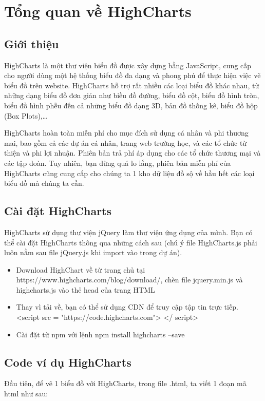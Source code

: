 \section{Tổng quan về HighCharts \cite{highcharts}} 

\subsection{Giới thiệu}
HighCharts là một thư viện biểu đồ được xây dựng bằng JavaScript, cung cấp cho người dùng một hệ thống biểu đồ đa dạng và phong phú để thực hiện việc vẽ biểu đồ trên website. HighCharts hỗ trợ rất nhiều các loại biểu đồ khác nhau, từ những dạng biểu đồ đơn giản như biều đồ đường, biểu đồ cột, biểu đồ hình tròn, biểu đồ hình phễu đến cả những biểu đồ dạng 3D, bản đồ thống kê, biểu đồ hộp (Box Plots),…

HighCharts hoàn toàn miễn phí cho mục đích sử dụng cá nhân và phi thương mai, bao gồm cả các dự án cá nhân, trang web trường học, và các tổ chức từ thiện và phi lợi nhuận. Phiên bản trả phí áp dụng cho các tổ chức thương mại và các tập đoàn. Tuy nhiên, bạn đừng quá lo lắng, phiên bản miễn phí của HighCharts cũng cung cấp cho chúng ta 1 kho dữ liệu đồ sộ về hầu hết các loại biểu đồ mà chúng ta cần.

\subsection{Cài đặt HighCharts}
HighCharts sử dụng thư viện jQuery làm thư viện ứng dụng của mình. Bạn có thể cài đặt HighCharts thông qua những cách sau (chú ý file HighCharts.js phải luôn nằm sau file jQuery.js khi import vào trong dự án).
\begin{itemize}
	\item Download HighChart về từ trang chủ tại https://www.highcharts.com/blog/download/, chèn file jquery.min.js và highcharts.js vào thẻ head của trang HTML
	\item Thay vì tải về, bạn có thể sử dụng CDN để truy cập tập tin trực tiếp. <script src = "https://code.highcharts.com"> </ script>
	\item Cài đặt từ npm với lệnh npm install highcharts –save
\end{itemize}

\subsection{Code ví dụ HighCharts}

Đầu tiên, để vẽ 1 biểu đồ với HighCharts, trong file .html, ta viết 1 đoạn mã html như sau:

